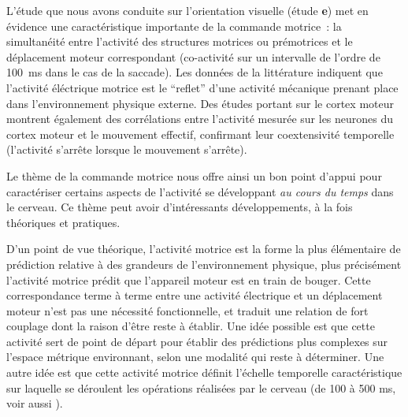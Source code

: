 \documentclass[11pt]{article}
\begin{document}

L'étude que nous avons conduite sur l'orientation visuelle (étude {\bf e})
met en évidence une caractéristique importante de la commande motrice~:
la simultanéité entre l'activité des structures motrices ou prémotrices
et le déplacement moteur correspondant (co-activité sur un intervalle de 
l'ordre de 100~ms dans le cas de la saccade).
Les données de la littérature indiquent que 
l'activité éléctrique motrice est le ``reflet'' d'une activité mécanique prenant place dans l'environnement
physique externe.
Des études portant sur le cortex moteur montrent également des corrélations entre l'activité  
mesurée sur les neurones du cortex moteur et le
mouvement effectif, confirmant leur coextensivité temporelle (l'activité s'arrête lorsque le mouvement s'arrête). 


Le thème de la commande motrice nous offre ainsi un bon point d'appui pour caractériser certains aspects
de l'activité se développant \textit{au cours du temps} dans le cerveau. Ce thème peut avoir d'intéressants
développements, à la fois théoriques et pratiques.

D'un point de vue théorique, l'activité motrice est la forme la plus élémentaire de prédiction
relative à des grandeurs  de l'environnement physique, plus précisément l'activité motrice
prédit que l'appareil moteur est en train de bouger.
Cette correspondance terme à terme entre une activité électrique et un déplacement moteur n'est pas
une nécessité fonctionnelle, et traduit une relation de fort couplage dont la
raison d'être reste à établir. Une idée possible est que cette activité sert de point de départ
pour établir des prédictions plus complexes sur l'espace métrique environnant, selon
une modalité  qui reste à déterminer. 
Une autre idée est que cette activité motrice définit l'échelle temporelle caractéristique 
sur laquelle se déroulent les opérations réalisées par le cerveau (de 100 à 500 ms, voir aussi ).
\end{document}
